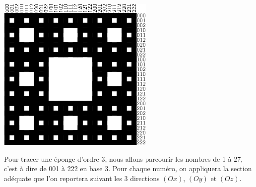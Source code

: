 \begin{center}
\includegraphics{images/menger-schema10.png}\\ 
\end{center}
Pour tracer une éponge d'ordre 3, nous allons parcourir les nombres de 1 à 27, c'est à dire de 001 à 222 en base 3. Pour chaque numéro, on appliquera la section adéquate que l'on reportera suivant les 3 directions $(Ox)$, $(Oy)$ et $(Oz)$.
